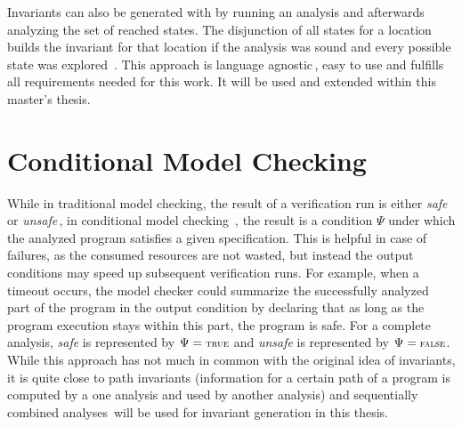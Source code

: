 Invariants can also be generated with \CPAchecker{} by running an analysis and afterwards
analyzing the set of reached states. The disjunction of all states for a location builds the
invariant for that location if the analysis was sound and every possible state was
explored~\cite{Beyer:KInduction}. This approach is language agnostic\,, easy to
use and fulfills all requirements needed for this work. It will be used and extended
within this master's thesis.

\section{Conditional Model Checking}\label{title:cmc}
While in traditional model checking, the result of a verification run is either \emph{safe} or
\emph{unsafe}\,,
in conditional model checking~\cite{Beyer:ConditionalModelChecking},
the result is a condition $\Psi$ under which the analyzed program satisfies a given specification. This is helpful
in case of failures, as the consumed resources are not wasted, but instead the output conditions may speed up
subsequent verification runs. For example, when a timeout occurs, the model checker could summarize the successfully
analyzed part of the program in the output condition by declaring that as long as the program execution stays
within this part, the program is safe. For a complete analysis, \emph{safe} is represented by $\Psi = \text{\true{}}$ and
\emph{unsafe} is represented by $\Psi = \text{\false{}}$. While this approach has not much in common with the original idea
of invariants, it is quite close to path invariants (information for a certain path of a program is computed by a
one analysis and used by another analysis) and sequentially combined analyses\,
will be used for invariant generation in this thesis.
